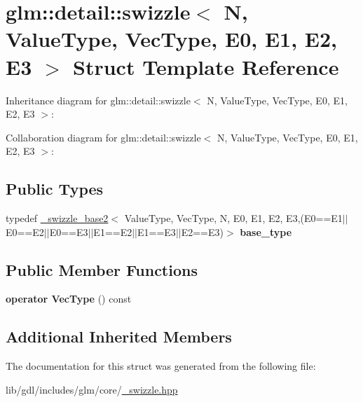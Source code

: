 \hypertarget{structglm_1_1detail_1_1swizzle}{}\section{glm\+:\+:detail\+:\+:swizzle$<$ N, Value\+Type, Vec\+Type, E0, E1, E2, E3 $>$ Struct Template Reference}
\label{structglm_1_1detail_1_1swizzle}


Inheritance diagram for glm\+:\+:detail\+:\+:swizzle$<$ N, Value\+Type, Vec\+Type, E0, E1, E2, E3 $>$\+:


Collaboration diagram for glm\+:\+:detail\+:\+:swizzle$<$ N, Value\+Type, Vec\+Type, E0, E1, E2, E3 $>$\+:
\subsection*{Public Types}
\begin{DoxyCompactItemize}
\item 
\hypertarget{structglm_1_1detail_1_1swizzle_a6f5b33550379282023990c48c29162f6}{}typedef \hyperlink{structglm_1_1detail_1_1__swizzle__base2}{\+\_\+swizzle\+\_\+base2}$<$ Value\+Type, Vec\+Type, N, E0, E1, E2, E3,(E0==E1$\vert$$\vert$E0==E2$\vert$$\vert$E0==E3$\vert$$\vert$E1==E2$\vert$$\vert$E1==E3$\vert$$\vert$E2==E3)$>$ {\bfseries base\+\_\+type}\label{structglm_1_1detail_1_1swizzle_a6f5b33550379282023990c48c29162f6}

\end{DoxyCompactItemize}
\subsection*{Public Member Functions}
\begin{DoxyCompactItemize}
\item 
\hypertarget{structglm_1_1detail_1_1swizzle_ac290a0b7725247c5971c8fb91f28992b}{}{\bfseries operator Vec\+Type} () const \label{structglm_1_1detail_1_1swizzle_ac290a0b7725247c5971c8fb91f28992b}

\end{DoxyCompactItemize}
\subsection*{Additional Inherited Members}


The documentation for this struct was generated from the following file\+:\begin{DoxyCompactItemize}
\item 
lib/gdl/includes/glm/core/\hyperlink{__swizzle_8hpp}{\+\_\+swizzle.\+hpp}\end{DoxyCompactItemize}
